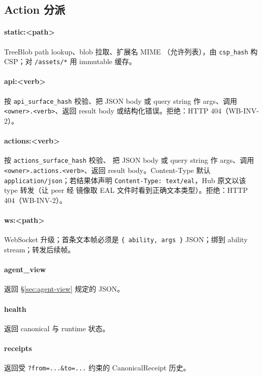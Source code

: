 \documentclass[11pt,a4paper]{article}
\theoremstyle{definition}
\begin{document}
\subsection{Action 分派}
\label{sec:hub-actions}

\paragraph{static:<path>} TreeBlob path lookup、blob 拉取、扩展名 MIME
（允许列表），由 \texttt{csp\_hash} 构 CSP；对 \texttt{/assets/*}
用 immutable 缓存。

\paragraph{api:<verb>} 按 \texttt{api\_surface\_hash} 校验、把 JSON
body 或 query string 作 args、调用 \texttt{<owner>.<verb>}、返回
result body 或结构化错误。拒绝：HTTP 404（WB-INV-2）。

\paragraph{actions:<verb>} 按 \texttt{actions\_surface\_hash} 校验、
把 JSON body 或 query string 作 args、调用
\texttt{<owner>.actions.<verb>}、返回 result body。Content-Type
默认 \texttt{application/json}；若结果体声明
\texttt{Content-Type: text/eal}，Hub 原文以该 type 转发（让 peer 经
镜像取 EAL 文件时看到正确文本类型）。拒绝：HTTP 404（WB-INV-2）。

\paragraph{ws:<path>} WebSocket 升级；首条文本帧必须是
\texttt{\{ ability, args \}} JSON；绑到 ability stream；转发后续帧。

\paragraph{agent\_view} 返回 \S\ref{sec:agent-view} 规定的 JSON。

\paragraph{health} 返回 canonical 与 runtime 状态。

\paragraph{receipts} 返回受 \texttt{?from=...\&to=...} 约束的
CanonicalReceipt 历史。
\end{document}
